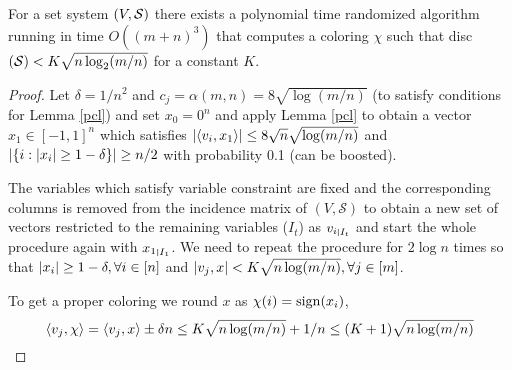 \begin{theorem}
For a set system $\left(V,\mathcal{S} \right )$ there exists a polynomial time randomized algorithm running in time $O((m+n)^3)$ that computes a coloring $\chi$ such that disc$\left(\mathcal{S} \right ) < K\sqrt{n\log_2(m/n)}$ for a constant $K$.
\end{theorem}
\begin{proof}
Let $\delta = 1/n^2$ and $c_j = \alpha(m,n) = 8 \sqrt{\log(m/n)}$ (to satisfy conditions for Lemma \ref{pcl}) and set $x_0 =0^n$ and apply Lemma \ref{pcl} to obtain a vector $x_1 \in [-1,1]^n$ which satisfies
$\left\lvert \left\langle v_i,x_1\right\rangle \right\rvert \leq 8\sqrt{n}\sqrt{\log(m/n)}$ and $\left\lvert \left\{i: \left\lvert x_i \right\rvert \geq 1 - \delta\right\} \right\rvert \geq n/2$ with probability 0.1 (can be boosted).\par
The variables which satisfy variable constraint are fixed and the corresponding columns is removed from the incidence matrix of $(V,\mathcal{S})$ to obtain a new set of vectors restricted to the remaining variables ($I_t$) as ${v_i}_{\mkern 1mu \vrule height 1ex\mkern2mu {I_t}}$ and start the whole procedure again with ${x_1}_{\mkern 1mu \vrule height 1ex\mkern2mu {I_1}}$.
We need to repeat the procedure for $2\log n$ times so that $\left\lvert x_i \right\rvert \geq 1- \delta, \forall i \in [n]$ and $\left\lvert v_j,x \right\rvert < K\sqrt{n\log(m/n)}, \forall j \in [m]$.

To get a proper coloring we round $x$ as $\chi(i) = \operatorname{sign}(x_i) $,
\[ \left\langle v_j,\chi\right\rangle = \left\langle v_j,x\right\rangle \pm \delta n \leq K\sqrt{n\log(m/n)} + 1/n \leq (K+1)\sqrt{n\log(m/n)} \]
\end{proof}

